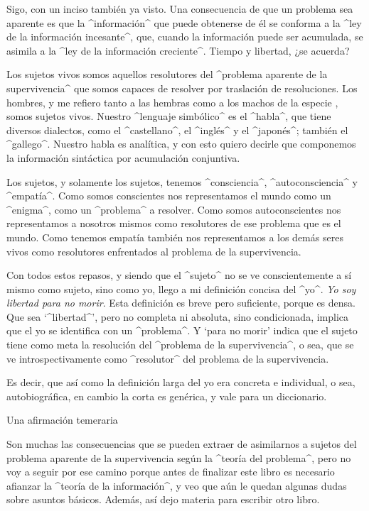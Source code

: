 Sigo, con un inciso también ya visto. Una consecuencia de que un
problema sea aparente es que la ^información^ que puede obtenerse de él
se conforma a la ^ley de la información incesante^, que, cuando la
información puede ser acumulada, se asimila a la ^ley de la información
creciente^. Tiempo y libertad, ¿se acuerda?

Los sujetos vivos somos aquellos resolutores del ^problema aparente de
la supervivencia^ que somos capaces de resolver por traslación de
resoluciones. Los hombres, y me refiero tanto a las hembras como a los
machos de la especie , somos sujetos vivos.
Nuestro ^lenguaje simbólico^ es el ^habla^, que tiene diversos
dialectos, como el ^castellano^, el ^inglés^ y el ^japonés^; también el
^gallego^. Nuestro habla es analítica, y con esto quiero decirle que
componemos la información sintáctica por acumulación conjuntiva.

Los sujetos, y solamente los sujetos, tenemos ^consciencia^,
^autoconsciencia^ y ^empatía^. Como somos conscientes nos representamos
el mundo como un ^enigma^, como un ^problema^ a resolver. Como somos
autoconscientes nos representamos a nosotros mismos como resolutores de
ese problema que es el mundo. Como tenemos empatía también nos
representamos a los demás seres vivos como resolutores enfrentados al
problema de la supervivencia.

Con todos estos repasos, y siendo que el ^sujeto^ no se ve
conscientemente a sí mismo como sujeto, sino como yo, llego a mi
definición concisa del ^yo^. {\em Yo soy libertad para no morir}. Esta
definición es breve pero suficiente, porque es densa. Que sea
`^libertad^', pero no completa ni absoluta, sino condicionada, implica
que el yo se identifica con un ^problema^. Y `para no morir' indica que
el sujeto tiene como meta la resolución del ^problema de la
supervivencia^, o sea, que se ve introspectivamente como ^resolutor^ del
problema de la supervivencia.

Es decir, que así como la definición larga del yo era concreta e
individual, o sea, autobiográfica, en cambio la corta es genérica, y
vale para un diccionario.


\Section Una afirmación temeraria

Son muchas las consecuencias que se pueden extraer de asimilarnos a
sujetos del problema aparente de la supervivencia según la ^teoría del
problema^, pero no voy a seguir por ese camino porque antes de finalizar
este libro es necesario afianzar la ^teoría de la información^, y veo
que aún le quedan algunas dudas sobre asuntos básicos. Además, así dejo
materia para escribir otro libro.


